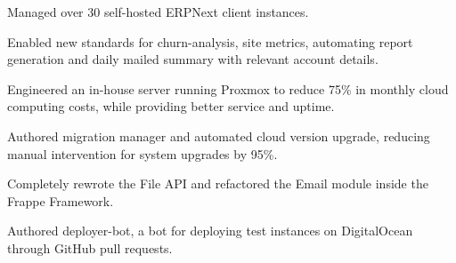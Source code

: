 {{\begin{exlist}
    \item Managed over 30 self-hosted ERPNext client instances.
    \item Enabled new standards for churn-analysis, site metrics, automating report
      generation and daily mailed summary with relevant account details.
    \item Engineered an in-house server running Proxmox to reduce 75\% in monthly cloud
      computing costs, while providing better service and uptime.
    \item Authored migration manager and automated cloud version upgrade, reducing manual
      intervention for system upgrades by 95\%.
    \item Completely rewrote the File API and refactored the Email module inside
      the Frappe Framework.
    \item Authored deployer-bot, a bot for deploying test instances on DigitalOcean through
      GitHub pull requests.
  \end{exlist}}
}


\newcommand{\pyroxmox}{
  \proj{Pyroxmox}%
  {A novel dynamic \python API for Proxmox VE. Primarily
    intended to be used to effortlessly spawn instances on the
  in-house server.}%
  {git.maych.in/thunderbottom/pyroxmox}
}

\newcommand{\ultimatebrowser}{
  \proj{Ultimate Browser Project}%
  {An Open-Source \android browser based on WebView which had
    over 100,000 downloads through XDA Forums and around 60,000
  concurrent sessions in April 2015.}%
  {github.com/thunderbottom/ultimatebrowserproject}
}


\newcommand{\activities}{
  \begin{exlist}
  \item Presented a talk on ``SSH Security Standards and Practices at Frappe'' at the ERPNext Conference 2019.
  \item Actively maintaing a fork of the Linux Kernel.
  \item Programmatically \href{https://soundcloud.com/harmonicseventhnoiseprotocol}{composing music} using FoxDot.
  \end{exlist}
}

